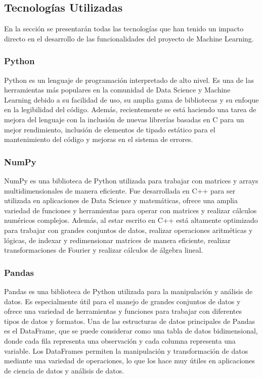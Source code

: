 \subsection{Tecnologías Utilizadas}
En la sección se presentarán todas las tecnologías que han tenido un impacto directo en el desarrollo de las 
funcionalidades del proyecto de Machine Learning.

\subsubsection{Python}
Python\cite{C8d} es un lenguaje de programación interpretado de alto nivel. Es una de las herramientas más populares 
en la comunidad de Data Science y Machine Learning debido a su facilidad de uso, su amplia gama de bibliotecas 
y su enfoque en la legibilidad del código. Además, recientemente se está haciendo una tarea de mejora del 
lenguaje con la inclusión de nuevas librerías basadas en C para un mejor rendimiento, inclusión de elementos 
de tipado estático para el mantenimiento del código y mejoras en el sistema de errores.

\subsubsection{NumPy}
NumPy\cite{Numpy} es una biblioteca de Python utilizada para trabajar con matrices y arrays multidimensionales de manera 
eficiente. Fue desarrollada en C++ para ser utilizada en aplicaciones de Data Science y matemáticas, ofrece 
una amplia variedad de funciones y herramientas para operar con matrices y realizar cálculos numéricos complejos. 
Además, al estar escrito en C++ está altamente optimizado para trabajar con grandes conjuntos de datos, realizar 
operaciones aritméticas y lógicas, de indexar y redimensionar matrices de manera eficiente, realizar transformaciones 
de Fourier y realizar cálculos de álgebra lineal.

\subsubsection{Pandas}
Pandas\cite{pandas} es una biblioteca de Python utilizada para la manipulación y análisis de datos. Es especialmente 
útil para el manejo de grandes conjuntos de datos y ofrece una variedad de herramientas y funciones para 
trabajar con diferentes tipos de datos y formatos. Una de las estructuras de datos principales de Pandas es 
el DataFrame, que se puede considerar como una tabla de datos bidimensional, donde cada fila representa una 
observación y cada columna representa una variable. Los DataFrames permiten la manipulación y transformación 
de datos mediante una variedad de operaciones, lo que los hace muy útiles en aplicaciones de ciencia de datos 
y análisis de datos. 

